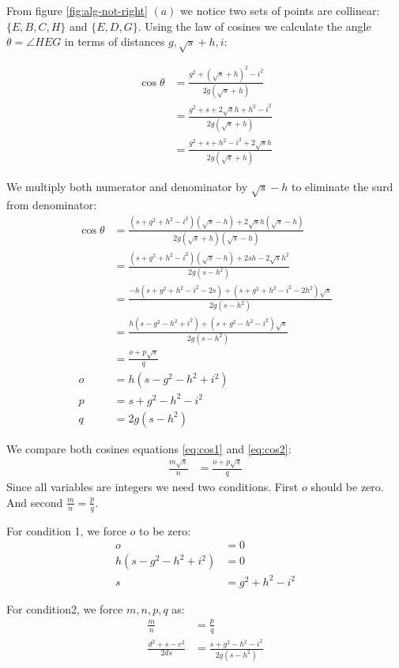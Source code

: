 \documentclass[11pt]{article}
\begin{document}
From figure \ref{fig:alg-not-right} $(a)$ we notice two sets of points are collinear:
$\{ E,B,C,H \}$ and $\{ E,D,G \}$. Using the law of cosines we calculate the 
angle $\theta = \angle{HEG}$ in terms of distances $g,\sqrt{s}+h,i$:

\begin{align}
\cos\theta &= \frac{g^2 + (\sqrt{s}+h)^2 - i^2}{2g(\sqrt{s}+h)} \nonumber\\
 &= \frac{g^2 + s + 2\sqrt{s}h + h^2 - i^2}{2g(\sqrt{s}+h)} \nonumber\\
 &= \frac{g^2 + s + h^2 - i^2+ 2\sqrt{s}h}{2g(\sqrt{s}+h)}
\end{align}

We multiply both numerator and denominator by $\sqrt{s}-h$ to eliminate the surd from denominator:
\begin{align}
\cos\theta &= \frac{(s + g^2 + h^2 - i^2)(\sqrt{s}-h) + 2\sqrt{s}h(\sqrt{s}-h)}
	{2g(\sqrt{s}+h)(\sqrt{s}-h)} \nonumber\\
 &= \frac{(s + g^2 + h^2 - i^2)(\sqrt{s}-h) + 2sh - 2\sqrt{s}h^2}
	{2g(s-h^2)} \nonumber\\ 
 &= \frac{-h(s + g^2 + h^2 - i^2 - 2s) + (s + g^2 + h^2 - i^2 - 2h^2)\sqrt{s}}
	{2g(s-h^2)} \nonumber\\ 
 &= \frac{h(s - g^2 - h^2 + i^2) + (s + g^2 - h^2 - i^2)\sqrt{s}}
	{2g(s-h^2)} \nonumber\\ 
 &= \frac{o + p\sqrt{s}}{q} \label{eq:cos2}\\
o &= h(s - g^2 - h^2 + i^2) \\
p &= s + g^2 - h^2 - i^2 \\
q &= 2g(s-h^2)
\end{align}

We compare both cosines equations \ref{eq:cos1} and \ref{eq:cos2}:
\begin{align}
\frac{m\sqrt{s}}{n} &= \frac{o + p\sqrt{s}}{q}
\end{align}
Since all variables are integers we need two conditions. First $o$ should be zero.
And second $\frac{m}{n} = \frac{p}{q}$.

For condition 1, we force $o$ to be zero:
\begin{align}
o &= 0 \nonumber\\
h(s - g^2 - h^2 + i^2) & = 0 \nonumber\\
s &= g^2 + h^2 - i^2 \label{eq:condition1}
\end{align}

For condition2, we force $m,n,p,q$ as:
\begin{align}
\frac{m}{n} &= \frac{p}{q} \nonumber\\
\frac{d^2 + s - e^2}{2ds} &= \frac{s + g^2 - h^2 - i^2}{2g(s-h^2)} \nonumber\\
\end{align}
\end{document}
